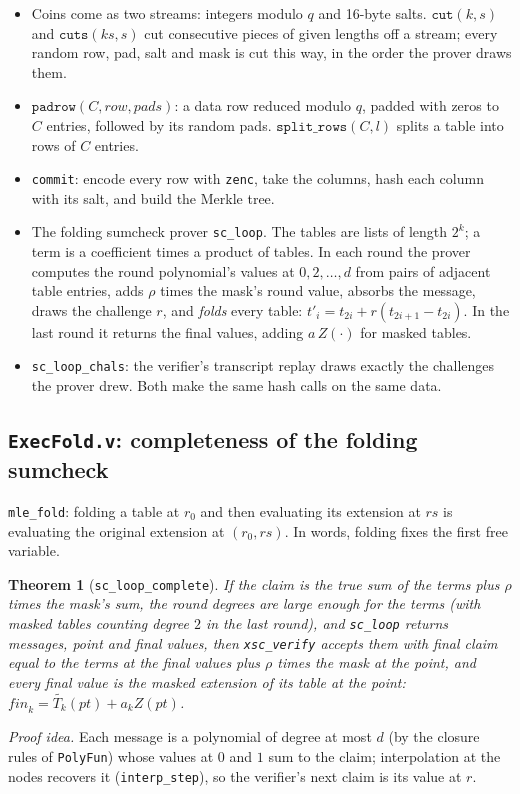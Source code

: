 \documentclass[11pt,a4paper]{article}
\newcommand{\mle}[1]{\widetilde{#1}}
\theoremstyle{definition}
\theoremstyle{plain}
\newtheorem{theorem}[definition]{Theorem}
\begin{document}
\begin{itemize}[leftmargin=1.3em]
\item Coins come as two streams: integers modulo $q$ and 16-byte salts. $\mathtt{cut}(k,s)$ and
  $\mathtt{cuts}(ks,s)$ cut consecutive pieces of given lengths off a stream; every random row, pad,
  salt and mask is cut this way, in the order the prover draws them.
\item $\mathtt{padrow}(C,\mathit{row},\mathit{pads})$: a data row reduced modulo $q$, padded with zeros
  to $C$ entries, followed by its random pads. $\mathtt{split\_rows}(C,l)$ splits a table into rows of
  $C$ entries.
\item \texttt{commit}: encode every row with \texttt{zenc}, take the columns, hash each column with its
  salt, and build the Merkle tree.
\item The folding sumcheck prover \texttt{sc\_loop}. The tables are lists of length $2^k$; a term is
  a coefficient times a product of tables. In each round the prover computes the round polynomial's
  values at $0,2,\dots,d$ from pairs of adjacent table entries, adds $\rho$ times the mask's round
  value, absorbs the message, draws the challenge $r$, and \emph{folds} every table:
  $t'_i=t_{2i}+r(t_{2i+1}-t_{2i})$. In the last round it returns the final values, adding
  $a\,Z(\cdot)$ for masked tables.
\item \texttt{sc\_loop\_chals}: the verifier's transcript replay draws exactly the challenges the
  prover drew. Both make the same hash calls on the same data.
\end{itemize}

\subsection{\texttt{ExecFold.v}: completeness of the folding sumcheck}

\texttt{mle\_fold}: folding a table at $r_0$ and then evaluating its extension at $rs$ is evaluating
the original extension at $(r_0,rs)$. In words, folding fixes the first free variable.
\begin{theorem}[\texttt{sc\_loop\_complete}]
If the claim is the true sum of the terms plus $\rho$ times the mask's sum, the round degrees are
large enough for the terms (with masked tables counting degree $2$ in the last round), and
\texttt{sc\_loop} returns messages, point and final values, then \texttt{xsc\_verify} accepts them with
final claim equal to the terms at the final values plus $\rho$ times the mask at the point, and every
final value is the masked extension of its table at the point:
$\mathit{fin}_k=\mle{T_k}(pt)+a_kZ(pt)$.
\end{theorem}
\emph{Proof idea.} Each message is a polynomial of degree at most $d$ (by the closure rules of
\texttt{PolyFun}) whose values at $0$ and $1$ sum to the claim; interpolation at the nodes recovers it
(\texttt{interp\_step}), so the verifier's next claim is its value at $r$.
\end{document}
